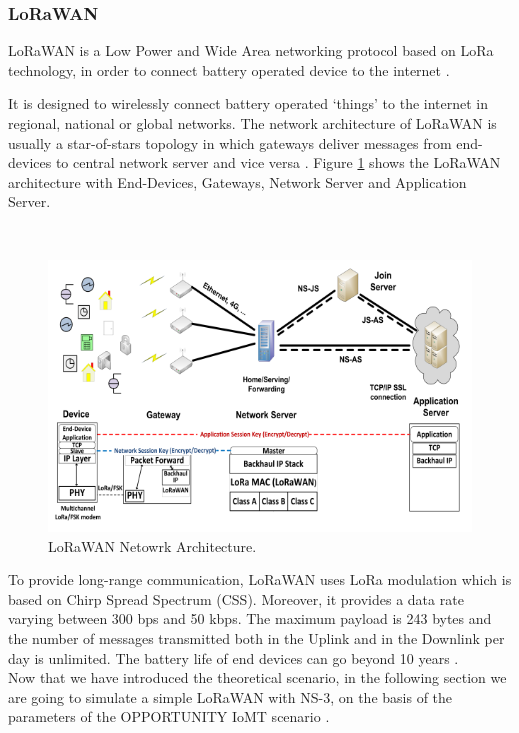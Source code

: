 \documentclass[10pt, a4paper, twocolumn]{article}
\theoremstyle{definition}
\begin{document}
\subsubsection{LoRaWAN}
LoRaWAN is a Low Power and Wide Area networking protocol based on LoRa technology, in order to connect battery operated device to the internet \cite{Lora_IoT}.  

It is designed to wirelessly connect battery operated ‘things’ to the internet in regional, national or global networks.
 The network architecture of LoRaWAN is usually a star-of-stars topology in which gateways deliver messages from end-devices to central network server and vice versa \cite{Lora_IoT}. Figure \ref{fig:Lora_architecture} shows the LoRaWAN architecture with End-Devices, Gateways, Network Server and Application Server.
 
\\
\begin{figure}
    \centering
    \includegraphics[scale = 0.9]{images/LoRa_arch_new.PNG}
    \caption{LoRaWAN Netowrk Architecture.}
    \label{fig:Lora_architecture}
\end{figure}
To provide long-range communication, LoRaWAN uses LoRa modulation which is based on Chirp Spread Spectrum (CSS). Moreover, it provides a data rate varying between 300 bps and 50 kbps. The maximum payload is 243 bytes and the number of messages transmitted both in the Uplink and in the Downlink per day is unlimited. The battery life of end devices can go beyond 10 years \cite{comparative_study}.%
\\
Now that we have introduced the theoretical scenario, in the following section we are going to simulate a simple LoRaWAN with NS-3, on the basis of the parameters of the OPPORTUNITY IoMT scenario \cite{experimental_evaluation}.
\end{document}
